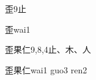 \begin{entry}{歪}{9}{⽌}
  \begin{phonetics}{歪}{wai1}
  \end{phonetics}
\end{entry}

\begin{entry}{歪果仁}{9,8,4}{⽌、⽊、⼈}
  \begin{phonetics}{歪果仁}{wai1 guo3 ren2}
  \end{phonetics}
\end{entry}



